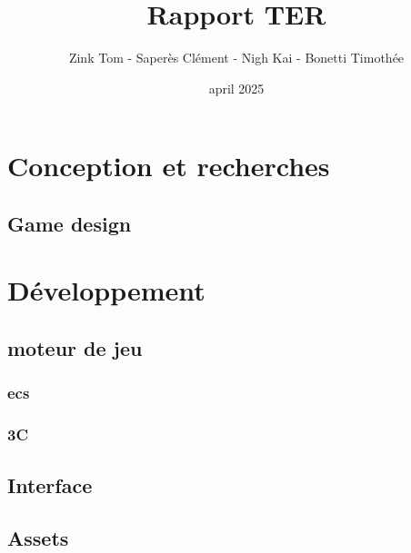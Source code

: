 \documentclass[french,a4paper,10pt]{article}
\title{\color{astral} \sffamily \bfseries Rapport TER}
\author{Zink Tom - Saperès Clément - Nigh Kai - Bonetti Timothée}
\date{april 2025}
\begin{document}
\maketitle

\hypersetup{
    hidelinks           %
}

\tableofcontents


\newpage


    

\newpage



\section{Conception et recherches}
    \subsection{Game design}
    
    
    
        
        


\section{Développement}
    
    
    \subsection{moteur de jeu}
        \subsubsection{ecs}
        \subsubsection{3C}

    \subsection{Interface}

    \subsection{Assets}
    
\end{document}

